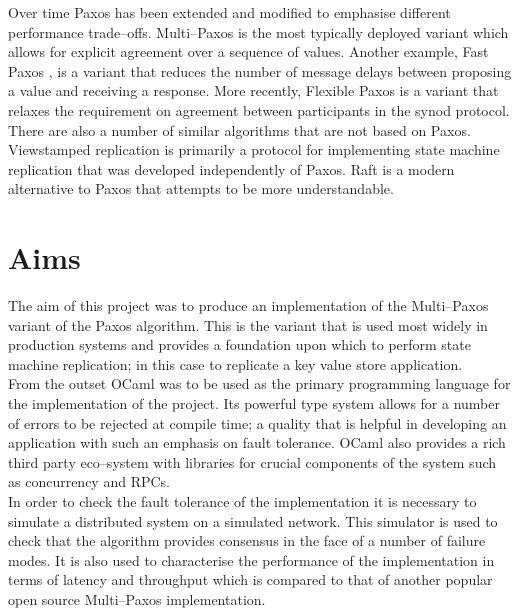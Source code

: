 Over time Paxos has been extended and modified to emphasise different performance trade--offs. Multi--Paxos is the most typically deployed variant which allows for explicit agreement over a sequence of values. Another example, Fast Paxos \cite{fast-paxos}, is a variant that reduces the number of message delays between proposing a value and receiving a response. More recently, Flexible Paxos \cite{DBLP:journals/corr/HowardMS16} is a variant that relaxes the requirement on agreement between participants in the synod protocol. \\

There are also a number of similar algorithms that are not based on Paxos. Viewstamped replication \cite{Oki:1988:VRN:62546.62549} is primarily a protocol for implementing state machine replication that was developed independently of Paxos. Raft \cite{Ongaro:2014:SUC:2643634.2643666} is a modern alternative to Paxos that attempts to be more understandable.

\section{Aims}

The aim of this project was to produce an implementation of the Multi--Paxos variant of the Paxos algorithm. This is the variant that is used most widely in production systems and provides a foundation upon which to perform state machine replication; in this case to replicate a key value store application. \\

From the outset OCaml was to be used as the primary programming language for the implementation of the project. Its powerful type system allows for a number of errors to be rejected at compile time; a quality that is helpful in developing an application with such an emphasis on fault tolerance. OCaml also provides a rich third party eco--system with libraries for crucial components of the system such as concurrency and RPCs. \\

In order to check the fault tolerance of the implementation it is necessary to simulate a distributed system on a simulated network. This simulator is used to check that the algorithm provides consensus in the face of a number of failure modes. It is also used to characterise the performance of the implementation in terms of latency and throughput which is compared to that of another popular open source Multi--Paxos implementation.




